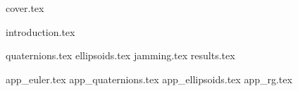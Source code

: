 \documentclass[a4paper]{report}
\begin{document}
{cover.tex}

\tableofcontents
\thispagestyle{empty}
\newpage
\setcounter{page}{1}

{introduction.tex}

{quaternions.tex}
{ellipsoids.tex}
{jamming.tex}
{results.tex}

\newpage
{}

{\renewcommand{\bibname}{References}}

\begin{appendices}

{app_euler.tex}
{app_quaternions.tex}
{app_ellipsoids.tex}
{app_rg.tex}

\end{appendices}
\end{document}
